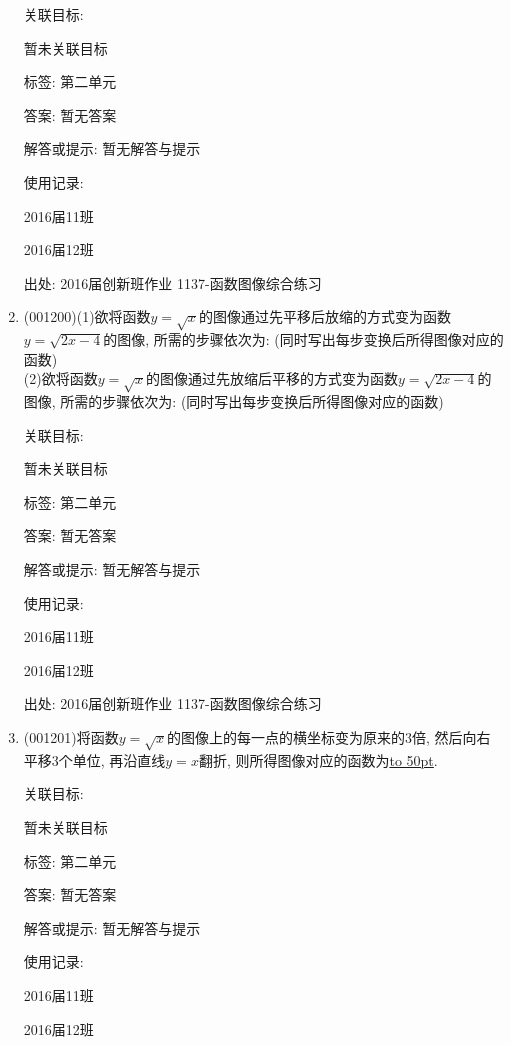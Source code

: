 \documentclass[10pt,a4paper]{article}
\newcommand{\blank}[1]{\underline{\hbox to #1pt{}}}
\begin{document}
\begin{enumerate}[1.]
关联目标:

暂未关联目标



标签: 第二单元

答案: 暂无答案

解答或提示: 暂无解答与提示

使用记录:

2016届11班		

2016届12班		


出处: 2016届创新班作业	1137-函数图像综合练习
\item { (001200)}(1)欲将函数$y=\sqrt{x}$的图像通过先平移后放缩的方式变为函数$y=\sqrt{2x-4}$的图像, 所需的步骤依次为: (同时写出每步变换后所得图像对应的函数)\\ 
(2)欲将函数$y=\sqrt{x}$的图像通过先放缩后平移的方式变为函数$y=\sqrt{2x-4}$的图像, 所需的步骤依次为: (同时写出每步变换后所得图像对应的函数)


关联目标:

暂未关联目标



标签: 第二单元

答案: 暂无答案

解答或提示: 暂无解答与提示

使用记录:

2016届11班		

2016届12班		


出处: 2016届创新班作业	1137-函数图像综合练习
\item { (001201)}将函数$y=\sqrt{x}$的图像上的每一点的横坐标变为原来的$3$倍, 然后向右平移$3$个单位, 再沿直线$y=x$翻折, 则所得图像对应的函数为\blank{50}.


关联目标:

暂未关联目标



标签: 第二单元

答案: 暂无答案

解答或提示: 暂无解答与提示

使用记录:

2016届11班	

2016届12班	



\end{enumerate}
\end{document}
